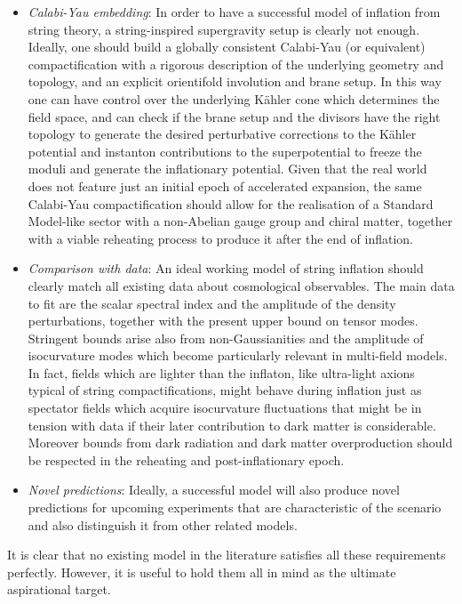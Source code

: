 \begin{itemize}
\item \emph{Calabi-Yau embedding}: In order to have a successful model of inflation from string theory, a string-inspired supergravity setup is clearly not enough. Ideally, one should build a globally consistent Calabi-Yau (or equivalent) compactification with a rigorous description of the underlying geometry and topology, and an explicit orientifold involution and brane setup. In this way one can have control over the underlying K\"ahler cone which determines the field space, and can check if the brane setup and the divisors have the right topology to generate the desired perturbative corrections to the K\"ahler potential and instanton contributions to the superpotential to freeze the moduli and generate the inflationary potential. Given that the real world does not feature just an initial epoch of accelerated expansion, the same Calabi-Yau compactification should allow for the realisation of a Standard Model-like sector with a non-Abelian gauge group and chiral matter, together with a viable reheating process to produce it after the end of inflation. 

\item \emph{Comparison with data}: An ideal working model of string inflation should clearly match all existing data about cosmological observables. The main data to fit are the scalar spectral index and the amplitude of the density perturbations, together with the present upper bound on tensor modes. Stringent bounds arise also from non-Gaussianities and the amplitude of isocurvature modes which become particularly relevant in multi-field models. In fact, fields which are lighter than the inflaton, like ultra-light axions typical of string compactifications, might behave during inflation just as spectator fields which acquire isocurvature fluctuations that might be in tension with data if their later contribution to dark matter is considerable. Moreover bounds from dark radiation and dark matter overproduction should be respected in the reheating and post-inflationary epoch. 

\item \emph{Novel predictions}: Ideally, a successful model will also produce novel predictions for upcoming experiments that are characteristic of the scenario and also distinguish it from other related models.

\end{itemize}

It is clear that no existing model in the literature satisfies all these requirements perfectly. However, it is useful to hold them all in mind as the ultimate aspirational target.

